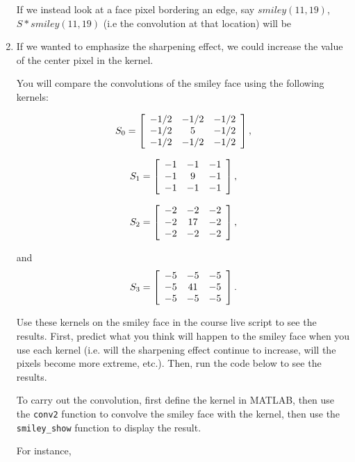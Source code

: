 \documentclass{ximera}
\begin{document}
\begin{problem}
\begin{enumerate}
If we instead look at a face pixel bordering an edge, say $smiley(11,19)$, $S*smiley(11,19)$ (i.e the convolution at that location) will be
\begin{multipleChoice}
\end{multipleChoice}

\item If we wanted to emphasize the sharpening effect, we could increase the value of the center pixel in the kernel.

You will compare the convolutions of the smiley face using the following kernels:

$$S_0=\startmat{ccc}
-1/2 & -1/2 & -1/2\\
-1/2 & 5 & -1/2\\
-1/2 & -1/2 & -1/2
\stopmat,$$

$$S_1=\startmat{ccc}
-1 & -1 & -1\\
-1 & 9 & -1\\
-1 & -1 & -1
\stopmat,$$

$$S_2=\startmat{ccc}
-2 & -2 & -2\\
-2 & 17 & -2\\
-2 & -2 & -2
\stopmat,$$

and %
$$S_3=\startmat{ccc}
-5 & -5 & -5\\
-5 & 41 & -5\\
-5 & -5 & -5
\stopmat.$$ 

Use these kernels on the smiley face in the course live script to see the results. First, predict what you think will happen to the smiley face when you use each kernel (i.e. will the sharpening effect continue to increase, will the pixels become more extreme, etc.). Then, run the code below to see the results.

To carry out the convolution, first define the kernel in MATLAB, then use the \texttt{conv2} function to convolve the smiley face with the kernel, then use the \texttt{smiley\_show} function to display the result.

For instance, 


\end{enumerate}
\end{problem}
\end{document}
